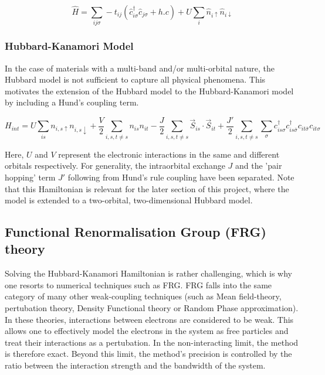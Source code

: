\documentclass[12pt]{article}
\begin{document}
\begin{equation}\label{t Hubbard model}
    \hat{H} = \sum_{ij\sigma} -t_{ij}(\hat{c}_{i\sigma}^{\dagger}\hat{c}_{j \sigma} + h.c) 
    + U \sum_{i} \hat{n}_{i \uparrow} \hat{n}_{i \downarrow}
\end{equation}





\subsubsection{Hubbard-Kanamori Model}
\label{subsubsec: HKmodel}
In the case of materials with a multi-band and/or multi-orbital nature, the Hubbard model is not sufficient to capture all physical phenomena. This motivates the extension of the Hubbard model to the Hubbard-Kanamori model\cite{sherman2020hubbard} by including a Hund's coupling term.

\begin{equation} \label{Hubbard-Kanamori Model}
    H_{int} = U \sum_{is}n_{i,s\uparrow}n_{i,s\downarrow} + \frac{V}{2} \sum_{i,s,t \neq s} n_{is}n_{it} -\frac{J}{2} \sum_{i,s,t \neq s} \vec{S}_{is} \cdot \vec{S}_{it} 
    + \frac{J'}{2} \sum_{i,s,t \neq s} \sum_{\sigma} c_{is\sigma}^{\dagger}c_{is\bar{\sigma}}^{\dagger}c_{it\bar{\sigma}}c_{it\sigma}
\end{equation}

\noindent Here, $U$ and $V$ represent the electronic interactions in the same and different orbitals respectively. For generality, the intraorbital exchange $J$ and the 'pair hopping' term $J'$ following from Hund's rule coupling have been separated.  
Note that this Hamiltonian is relevant for the later section of this project, where the model is extended to a two-orbital, two-dimensional Hubbard model.

\subsection{Functional Renormalisation Group (FRG) theory}

Solving the Hubbard-Kanamori Hamiltonian is rather challenging, which is why one resorts to numerical techniques such as FRG. FRG falls into the same category of many other weak-coupling techniques (such as Mean field-theory\cite{kadanoff2009more}, pertubation theory\cite{nagaosa2013quantum}, Density Functional theory\cite{kohn1965self} or Random Phase approximation\cite{bohm1951collective}).
In these theories, interactions between electrons are considered to be weak. This allows one to effectively model the electrons in the system as free particles 
and treat their interactions as a pertubation. In the non-interacting limit, the method is therefore exact. Beyond this limit, the method's precision is controlled by the ratio between the interaction
strength and the bandwidth of the system. 
\end{document}
